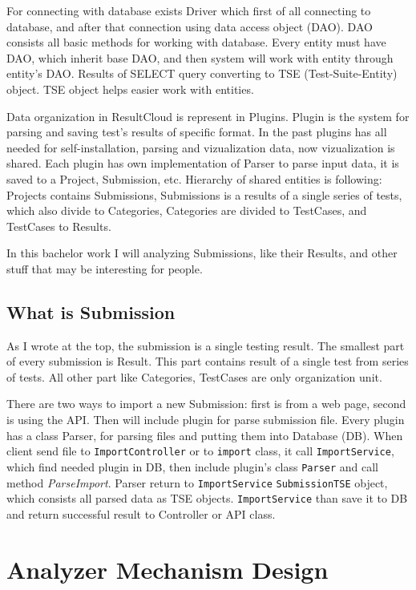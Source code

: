 For connecting with database exists Driver which first of all connecting to database, and after that connection using data access object (DAO). DAO consists all basic methods for working with database. Every entity must have DAO, which inherit base DAO, and then system will work with entity through entity's DAO. Results of SELECT query converting to TSE (Test-Suite-Entity) object. TSE object helps easier work with entities.

Data organization in ResultCloud is represent in Plugins. Plugin is the system for parsing and saving test's results of specific format. In the past plugins has all needed for self-installation, parsing and vizualization data, now vizualization is shared. 
Each plugin has own implementation of Parser to parse input data, it is saved to a Project, Submission, etc. Hierarchy of shared entities is following: Projects  contains Submissions, Submissions is a results of a single series of tests, which also divide to Categories, Categories are divided to TestCases, and TestCases to Results.

In this bachelor work I will analyzing Submissions, like their Results, and other stuff that may be interesting for people.

\section{What is Submission}

As I wrote at the top, the submission is a single testing result. The smallest part of every submission is Result. This part contains result of a single test from series of tests. All other part like Categories, TestCases are only organization unit. 

There are two ways to import a new Submission: first is from a web page, second is using the API. Then will include plugin for parse submission file. Every plugin has a class Parser, for parsing files and putting them into Database (DB). When client send file to \texttt{ImportController} or to \texttt{import} class, it call \texttt{ImportService}, which find needed plugin in DB, then include plugin's class \texttt{Parser} and call method \emph{ParseImport}. Parser return to \texttt{ImportService} \texttt{SubmissionTSE} object, which consists all parsed data as TSE objects. \texttt{ImportService} than save it to DB and return successful result to Controller or API class.

\chapter{Analyzer Mechanism Design}

